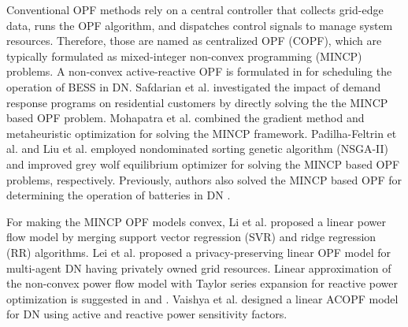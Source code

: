 \documentclass{article}
\begin{document}
Conventional OPF methods rely on a central controller that collects grid-edge data, runs the OPF algorithm, and dispatches control signals to manage system resources. Therefore, those are named as centralized OPF (COPF), which are typically formulated as mixed-integer non-convex programming (MINCP) problems. A non-convex active-reactive OPF is formulated in \cite{Gabash} for scheduling the operation of BESS in DN. Safdarian et al. \cite{Safdarian} investigated the impact of demand response programs on residential customers by directly solving the the MINCP based OPF problem. Mohapatra et al. \cite{Mohapatra} combined the gradient method and metaheuristic optimization for solving the MINCP framework. Padilha-Feltrin et al. \cite{Padilha-Feltrin} and Liu et al. \cite{Liu} employed nondominated sorting genetic algorithm (NSGA-II) and improved grey wolf equilibrium optimizer for solving the MINCP based OPF problems, respectively. Previously, authors also solved the MINCP based OPF for determining the operation of batteries in DN \cite{Jha}.   

For making the MINCP OPF models convex, Li et al. \cite{Li} proposed a linear power flow model by merging support vector regression (SVR) and ridge regression (RR) algorithms. Lei et al. \cite{Lei} proposed a privacy-preserving linear OPF model for multi-agent DN having privately owned grid resources.  Linear approximation of the non-convex power flow model with Taylor series expansion for reactive power optimization is suggested in \cite{spaul} and \cite{Yang}. Vaishya et al. \cite{Vaishya} designed a linear ACOPF model for DN using active and reactive power sensitivity factors.
\end{document}
